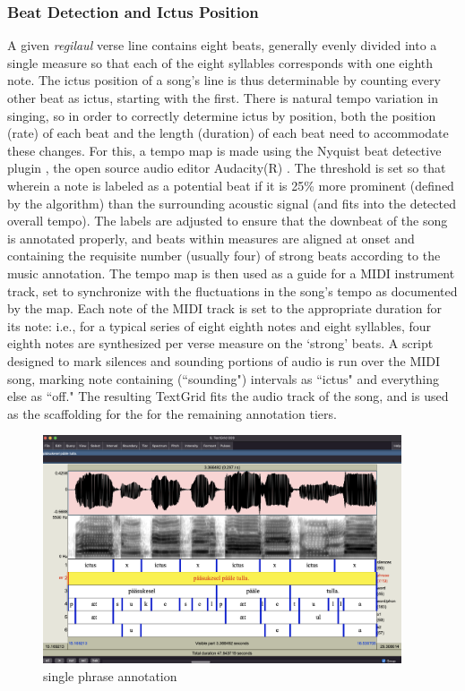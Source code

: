 \documentclass[12pt]{article}
\begin{document}
\subsubsection*{Beat Detection and Ictus Position} 
A given {\it regilaul} verse line contains eight beats, generally evenly divided into a single measure so that each of the eight syllables corresponds with one eighth note. The ictus position of a song's line is thus determinable by counting every other beat as ictus, starting with the first. There is natural tempo variation in singing, so in order to correctly determine ictus by position, both the position (rate) of each beat and the length (duration) of each beat need to accommodate these changes. For this, a tempo map is made using the Nyquist beat detective plugin \cite{AudioNyqNyquistAudacity}, the open source audio editor Audacity(R) \cite{Audacity}. The threshold is set so that wherein a note is labeled as a potential beat if it is 25\% more prominent (defined by the algorithm) than the surrounding acoustic signal (and fits into the detected overall tempo). The labels are adjusted to ensure that the downbeat of the song is annotated properly, and beats within measures are aligned at onset and containing the requisite number (usually four) of strong beats according to the music annotation.  The tempo map is then used as a guide for a MIDI instrument track, set to synchronize with the fluctuations in the song's tempo as documented by the map. Each note of the MIDI track is set to the appropriate duration for its note: i.e., for a typical series of eight eighth notes and eight syllables, four eighth notes are synthesized per verse measure on the `strong' beats. A script designed to mark silences and sounding portions of audio is run over the MIDI song, marking note containing (``sounding") intervals as ``ictus" and everything else as ``off." The resulting TextGrid fits the audio track of the song, and is used as the scaffolding for the for the remaining annotation tiers. 

\begin{figure}[htbp]
\begin{center}
			\includegraphics[width=300pt]{figures/phrase_grid.png}
			\caption{single phrase annotation}
\label{phrase}
\end{center}
\end{figure}
\end{document}
